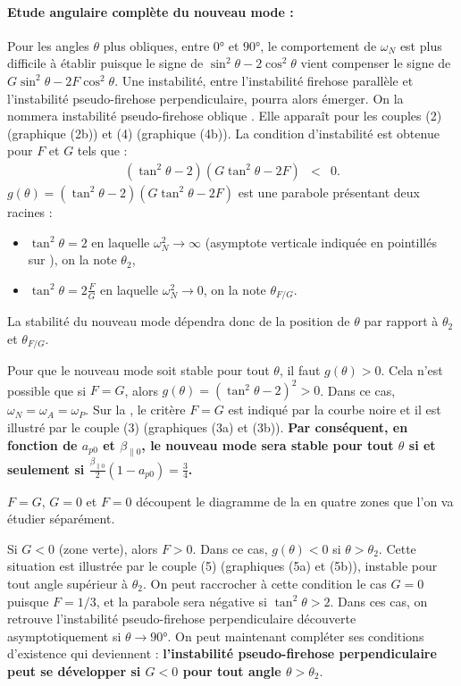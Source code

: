  \paragraph{Etude angulaire complète du nouveau mode : } Pour les angles $\theta$ plus obliques, entre $\ang{0}$ et $\ang{90}$, le comportement de $\omega_N$ est plus difficile à établir puisque le signe de $\sin^2 \theta - 2 \cos^2 \theta$ vient compenser le signe de $G \sin^2 \theta - 2F \cos^2 \theta$. Une instabilité, entre l'instabilité firehose parallèle et l'instabilité pseudo-firehose perpendiculaire, pourra alors émerger. On la nommera \og instabilité pseudo-firehose oblique \fg{}. Elle apparaît pour les couples (2) (graphique (2b)) et (4) (graphique (4b)). La condition d'instabilité est obtenue pour $F$ et $G$ tels que :  
\begin{eqnarray}
    (\tan^2 \theta - 2 )(G \tan^2 \theta - 2F ) &<& 0  .
\end{eqnarray}
$g(\theta) = (\tan^2 \theta - 2 )(G \tan^2 \theta - 2F )$ est une parabole présentant deux racines : 
\begin{itemize}
    \item $\tan^2 \theta = 2 $ en laquelle $\omega^2_N \rightarrow \infty$ (asymptote verticale indiquée en pointillés sur ), on la note $\theta_2$,
    \item $\tan^2 \theta = 2\frac{F}{G}$ en laquelle $\omega^2_N \rightarrow 0$, on la note $\theta_{F/G}$.
\end{itemize}
La stabilité du nouveau mode dépendra donc de la position de $\theta$ par rapport à $\theta_2$ et $\theta_{F/G}$. 
 
 Pour que le nouveau mode soit stable pour tout $\theta$, il faut $g(\theta)>0$. Cela n'est possible que si $F=G$, alors $g(\theta) = (\tan^2 \theta - 2 )^2 >0$. Dans ce cas, $\omega_N = \omega_A = \omega_P$. Sur la , le critère $F=G$ est indiqué par la courbe noire et il est illustré par le couple (3) (graphiques (3a) et (3b)). {\bf Par conséquent, en fonction de $a_{p0}$ et $\beta_{\parallel 0}$, le nouveau mode sera stable pour tout $\theta$ si et seulement si $ \frac{\beta_{\parallel 0}}{2}(1-a_{p0}) = \frac{3}{4} $.}
 
$F=G$, $G=0$ et $F=0$ découpent le diagramme de la  en quatre zones que l'on va étudier séparément. 

 Si $G<0$ (zone verte), alors $F>0$. Dans ce cas, $g(\theta) < 0$ si $\theta > \theta_2$. Cette situation est illustrée par le couple (5) (graphiques (5a) et (5b)), instable pour tout angle supérieur à $\theta_2$. On peut raccrocher à cette condition le cas $G=0$ puisque $F=1/3$, et la parabole sera négative si $\tan^2 \theta > 2$. Dans ces cas, on retrouve l'instabilité pseudo-firehose perpendiculaire découverte asymptotiquement si $\theta \rightarrow \ang{90}$. On peut maintenant compléter ses conditions d'existence qui deviennent : {\bf l'instabilité pseudo-firehose perpendiculaire peut se développer si $G<0$ pour tout angle $\theta > \theta_2$}.

